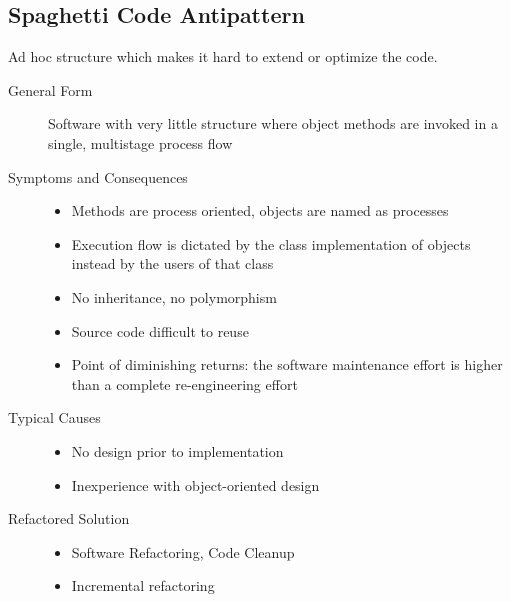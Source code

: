 \subsection{Spaghetti Code Antipattern}
Ad hoc structure which makes it hard to extend or optimize the code.
\begin{description}
  \item[General Form] Software with very little structure where object methods are invoked in a single, multistage process flow
  \item[Symptoms and Consequences] \hfill
  \begin{itemize}
    \item Methods are process oriented, objects are named as processes
    \item Execution flow is dictated by the class implementation of objects instead by the users of that class
    \item No inheritance, no polymorphism
    \item Source code difficult to reuse
    \item Point of diminishing returns: the software maintenance effort is higher than a complete re-engineering effort
  \end{itemize}
  \item[Typical Causes] \hfill
  \begin{itemize}
    \item No design prior to implementation
    \item Inexperience with object-oriented design
  \end{itemize}
  \item[Refactored Solution]
  \begin{itemize}
  	\item Software Refactoring, Code Cleanup
  	\item Incremental refactoring
  \end{itemize}
\end{description}
\newpage

